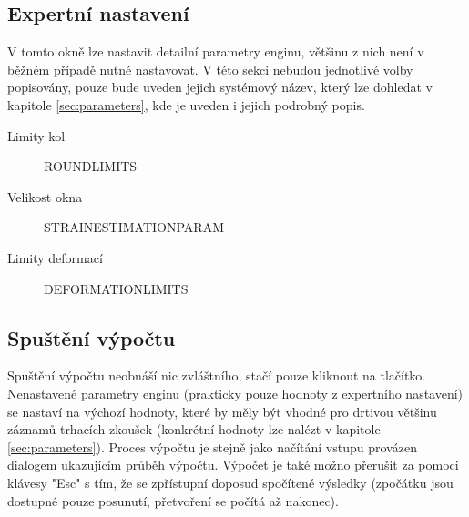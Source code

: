 \documentclass[a4paper,12pt]{article}
\begin{document}
\subsection{Expertní nastavení}
\begin{figure}[H]
\end{figure}
V tomto okně lze nastavit detailní parametry enginu, většinu z nich není v běžném případě nutné nastavovat. V této sekci nebudou jednotlivé volby popisovány, pouze bude uveden jejich systémový název, který lze dohledat v kapitole \ref{sec:parameters}, kde je uveden i jejich podrobný popis.
\begin{description}
\item[Limity kol] ROUND\textunderscore LIMITS
\item[Velikost okna] STRAIN\textunderscore ESTIMATION\textunderscore PARAM
\item[Limity deformací] DEFORMATION\textunderscore LIMITS 
\end{description}
\subsection{Spuštění výpočtu}
Spuštění výpočtu neobnáší nic zvláštního, stačí pouze kliknout na tlačítko. Nenastavené parametry enginu (prakticky pouze hodnoty z expertního nastavení) se nastaví na výchozí hodnoty, které by měly být vhodné pro drtivou většinu záznamů trhacích zkoušek (konkrétní hodnoty lze nalézt v kapitole \ref{sec:parameters}). Proces výpočtu je stejně jako načítání vstupu provázen dialogem ukazujícím průběh výpočtu. Výpočet je také možno přerušit za pomoci klávesy "Esc" s tím, že se zpřístupní doposud spočítené výsledky (zpočátku jsou dostupné pouze posunutí, přetvoření se počítá až nakonec).
\end{document}
